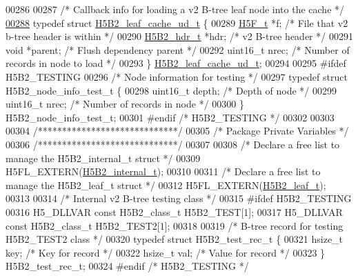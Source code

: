 \begin{DoxyCode}
{{00286 
00287 \textcolor{comment}{/* Callback info for loading a v2 B-tree leaf node into the cache */}
\hyperlink{struct_h5_b2__leaf__cache__ud__t}{00288} \textcolor{keyword}{typedef} \textcolor{keyword}{struct }\hyperlink{struct_h5_b2__leaf__cache__ud__t}{H5B2\_leaf\_cache\_ud\_t} \{
00289     \hyperlink{struct_h5_f__t}{H5F\_t} *f;                   \textcolor{comment}{/* File that v2 b-tree header is within */}
00290     \hyperlink{struct_h5_b2__hdr__t}{H5B2\_hdr\_t} *hdr;            \textcolor{comment}{/* v2 B-tree header */}
00291     \textcolor{keywordtype}{void} *parent;               \textcolor{comment}{/* Flush dependency parent */}
00292     uint16\_t nrec;              \textcolor{comment}{/* Number of records in node to load */}
00293 \} \hyperlink{struct_h5_b2__leaf__cache__ud__t}{H5B2\_leaf\_cache\_ud\_t};
00294 
00295 \textcolor{preprocessor}{#ifdef H5B2\_TESTING}
00296 \textcolor{comment}{/* Node information for testing */}
00297 \textcolor{keyword}{typedef} \textcolor{keyword}{struct }H5B2\_node\_info\_test\_t \{
00298     uint16\_t depth;             \textcolor{comment}{/* Depth of node */}
00299     uint16\_t nrec;              \textcolor{comment}{/* Number of records in node */}
00300 \} H5B2\_node\_info\_test\_t;
00301 \textcolor{preprocessor}{#endif }\textcolor{comment}{/* H5B2\_TESTING */}\textcolor{preprocessor}{}
00302 
00303 
00304 \textcolor{comment}{/*****************************/}
00305 \textcolor{comment}{/* Package Private Variables */}
00306 \textcolor{comment}{/*****************************/}
00307 
00308 \textcolor{comment}{/* Declare a free list to manage the H5B2\_internal\_t struct */}
00309 H5FL\_EXTERN(\hyperlink{struct_h5_b2__internal__t}{H5B2\_internal\_t});
00310 
00311 \textcolor{comment}{/* Declare a free list to manage the H5B2\_leaf\_t struct */}
00312 H5FL\_EXTERN(\hyperlink{struct_h5_b2__leaf__t}{H5B2\_leaf\_t});
00313 
00314 \textcolor{comment}{/* Internal v2 B-tree testing class */}
00315 \textcolor{preprocessor}{#ifdef H5B2\_TESTING}
00316 H5\_DLLVAR \textcolor{keyword}{const} H5B2\_class\_t H5B2\_TEST[1];
00317 H5\_DLLVAR \textcolor{keyword}{const} H5B2\_class\_t H5B2\_TEST2[1];
00318 
00319 \textcolor{comment}{/* B-tree record for testing H5B2\_TEST2 class */}
00320 \textcolor{keyword}{typedef} \textcolor{keyword}{struct }H5B2\_test\_rec\_t \{
00321     hsize\_t key;        \textcolor{comment}{/* Key for record */}
00322     hsize\_t val;        \textcolor{comment}{/* Value for record */}
00323 \} H5B2\_test\_rec\_t;
00324 \textcolor{preprocessor}{#endif }\textcolor{comment}{/* H5B2\_TESTING */}\textcolor{preprocessor}{}
}}
\end{DoxyCode}
